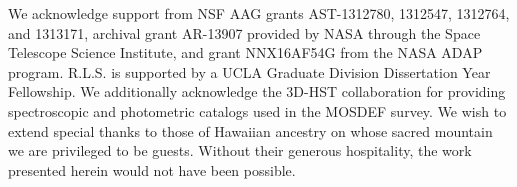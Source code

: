 \documentclass[iop,twocolappendix]{emulateapj}
\begin{document}
\acknowledgements We acknowledge support from NSF AAG grants AST-1312780, 1312547, 1312764, and 1313171,
 archival grant AR-13907 provided by NASA through the Space Telescope Science Institute,
 and grant NNX16AF54G from the NASA ADAP program.
  R.L.S. is supported by a UCLA Graduate Division Dissertation Year Fellowship.
  We additionally acknowledge the 3D-HST collaboration
 for providing spectroscopic and photometric catalogs used in the MOSDEF survey.
  We wish to extend special thanks to those of Hawaiian ancestry on
 whose sacred mountain we are privileged to be guests. Without their generous hospitality,
 the work presented herein would not have been possible.



\end{document}
